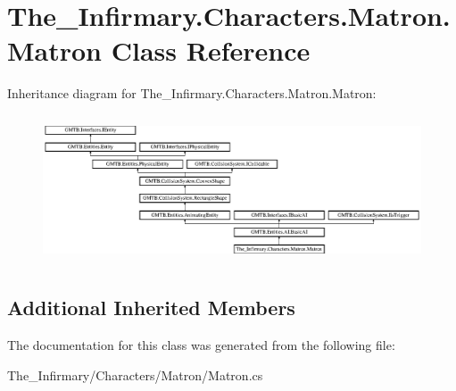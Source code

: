 \hypertarget{class_the___infirmary_1_1_characters_1_1_matron_1_1_matron}{}\section{The\+\_\+\+Infirmary.\+Characters.\+Matron.\+Matron Class Reference}
\label{class_the___infirmary_1_1_characters_1_1_matron_1_1_matron}
Inheritance diagram for The\+\_\+\+Infirmary.\+Characters.\+Matron.\+Matron\+:\begin{figure}[H]
\begin{center}
\leavevmode
\includegraphics[height=4.426877cm]{class_the___infirmary_1_1_characters_1_1_matron_1_1_matron}
\end{center}
\end{figure}
\subsection*{Additional Inherited Members}


The documentation for this class was generated from the following file\+:\begin{DoxyCompactItemize}
\item 
The\+\_\+\+Infirmary/\+Characters/\+Matron/Matron.\+cs\end{DoxyCompactItemize}
